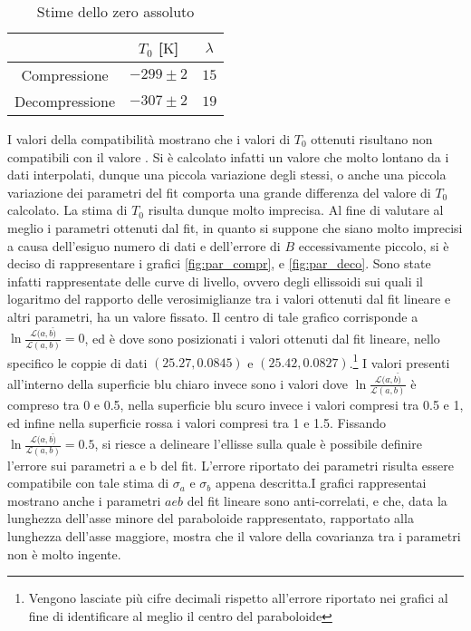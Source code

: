 \documentclass[a4paper,11pt,oneside]{article}
\begin{document}
\begin{table}[h!]
    \centering
    \begin{tabular}{|c|c|c|}
        \hline
        & $T_{0}$ [$\si{\kelvin}$] & $\lambda$\\ \hline
        Compressione & $-299\pm2$ & $15$\\ \hline
        Decompressione & $-307\pm2$ & $19$\\ \hline
    \end{tabular}
    \caption{Stime dello zero assoluto}
    \label{tab:zero_ass}
\end{table}


I valori della compatibilità mostrano che i valori di $T_0$ ottenuti risultano non compatibili con il valore . Si è calcolato infatti un valore che molto lontano da i dati interpolati, dunque una piccola variazione degli stessi, o anche una piccola variazione dei parametri del fit comporta una grande differenza del valore di $T_0$ calcolato. La stima di $T_0$ risulta dunque molto imprecisa.
Al fine di valutare al meglio i parametri ottenuti dal fit, in quanto si suppone che siano molto imprecisi a causa dell'esiguo numero di dati e dell'errore di $B$ eccessivamente piccolo, si è deciso di rappresentare i grafici \ref{fig:par_compr}, e \ref{fig:par_deco}. 
Sono state infatti rappresentate delle curve di livello, ovvero degli ellissoidi sui quali il logaritmo del rapporto delle verosimiglianze tra i valori ottenuti dal fit lineare e altri parametri, ha un valore fissato. Il centro di tale grafico corrisponde a $\ln\frac{\mathcal{L}(a\hat,b\hat)}{\mathcal{L}(a,b)}=0$, ed è dove sono posizionati i valori ottenuti dal fit lineare, nello specifico le coppie di dati $(25.27,0.0845)$ e $(25.42,0.0827)$.\footnote{Vengono lasciate più cifre decimali rispetto all'errore riportato nei grafici al fine di identificare al meglio il centro del paraboloide} I valori presenti all'interno della superficie blu chiaro invece sono i valori dove $\ln\frac{\mathcal{L}(a\hat,b\hat)}{\mathcal{L}(a,b)}$ è compreso tra 0 e 0.5, nella superficie blu scuro invece i valori compresi tra 0.5 e 1, ed infine nella superficie rossa i valori compresi tra 1 e 1.5. Fissando $\ln\frac{\mathcal{L}(a\hat,b\hat)}{\mathcal{L}(a,b)}= 0.5$, si riesce a delineare l'ellisse sulla quale è possibile definire l'errore sui parametri a e b del fit. L'errore riportato dei parametri risulta essere compatibile con tale stima di $\sigma_a$ e $\sigma_b$ appena descritta.I grafici rappresentai mostrano anche i parametri $a e b$ del fit lineare sono anti-correlati, e che, data la lunghezza dell'asse minore del paraboloide rappresentato, rapportato alla lunghezza dell'asse maggiore, mostra che il valore della covarianza tra i parametri non è molto ingente. 
\end{document}
